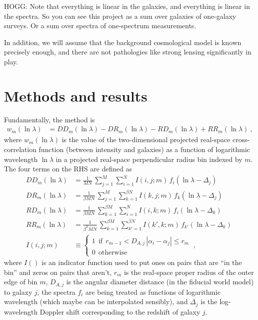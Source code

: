 \documentclass{article}
\begin{document}
HOGG: Note that everything is linear in the galaxies, and everything is linear in the spectra. So you can see this project as a sum over galaxies of one-galaxy surveys. Or a sum over spectra of one-spectrum measurements.

In addition, we will assume that the background cosmological model is known precisely enough, and there are not pathologies like strong lensing significantly in play.

\section{Methods and results}\label{sec:method}
Fundamentally, the method is
\begin{align}
    w_m(\ln\lambda) &= DD_m(\ln\lambda) - DR_m(\ln\lambda) - RD_m(\ln\lambda) + RR_m(\ln\lambda) ~,
\end{align}
where $w_m(\ln\lambda)$ is the value of the two-dimensional projected real-space cross-correlation function (between intensity and galaxies) as a function of logarithmic wavelength $\ln\lambda$ in a projected real-space perpendicular radius bin indexed by $m$.
The four terms on the RHS are defined as
\begin{align}
    DD_m(\ln\lambda) &= \frac{1}{MN}\,\sum_{j=1}^{M}\sum_{i=1}^N I(i,j;m)\,f_i(\ln\lambda-\Delta_j) \\
    DR_m(\ln\lambda) &= \frac{1}{\beta MN}\,\sum_{j=1}^{M}\sum_{k=1}^{\beta N} I(k,j;m)\,f_k(\ln\lambda-\Delta_j) \\
    RD_m(\ln\lambda) &= \frac{1}{\beta MN}\,\sum_{k=1}^{\beta M}\sum_{i=1}^N I(i,k;m)\,f_i(\ln\lambda-\Delta_k) \\
    RR_m(\ln\lambda) &= \frac{1}{\beta^2 MN}\,\sum_{k=1}^{\beta M}\sum_{k'=1}^{\beta N} I(k',k;m)\,f_{k'}(\ln\lambda-\Delta_k) \\
    I(i,j;m) &\equiv\left\{\begin{array}{l}1~~\text{if}~~r_{m-1}<D_{A,j}\,|\alpha_i-\alpha_j|\leq r_m \\ 0~~\text{otherwise}\end{array}\right.~,
\end{align}
where $I()$ is an indicator function used to put ones on pairs that are ``in the bin'' and zeros on pairs that aren't,
$r_m$ is the real-space proper radius of the outer edge of bin $m$,
$D_{A,j}$ is the angular diameter distance (in the fiducial world model) to galaxy $j$,
the spectra $f_i$ are being treated as functions of logarithmic wavelength (which maybe can be interpolated sensibly),
and $\Delta_j$ is the log-wavelength Doppler shift corresponding to the redshift of galaxy $j$.
\end{document}
